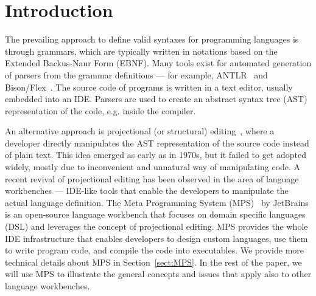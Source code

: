 \section{Introduction}

The prevailing approach to define valid syntaxes for programming languages is through grammars, which are typically written in notations based on the Extended Backus-Naur Form (EBNF).
Many tools exist for automated generation of parsers from the grammar definitions --- for example, ANTLR~\cite{ref:ANTLRBOOK,ref:ANTLR} and Bison/Flex~\cite{ref:BISONFLEX}.
The source code of programs is written in a text editor, usually embedded into an IDE. Parsers are used to create an abstract syntax tree (AST) representation of the code, e.g. inside the compiler.

An alternative approach is projectional (or structural) editing~\cite{ref:VWK15}, where a developer directly manipulates the AST representation of the source code instead of plain text.
This idea emerged as early as in 1970s, but it failed to get adopted widely, mostly due to inconvenient and unnatural way of manipulating code.
A recent revival of projectional editing has been observed in the area of language workbenches --- IDE-like tools that enable the developers to manipulate the actual language definition.
The Meta Programming System (MPS)~\cite{ref:MPS,ref:MPSBOOK} by JetBrains is an open-source language workbench that focuses on domain specific languages (DSL) and leverages the concept of projectional editing.
MPS provides the whole IDE infrastructure that enables developers to design custom languages, use them to write program code, and compile the code into executables.
We provide more technical details about MPS in Section~\ref{sect:MPS}.
In the rest of the paper, we will use MPS to illustrate the general concepts and issues that apply also to other language workbenches.



